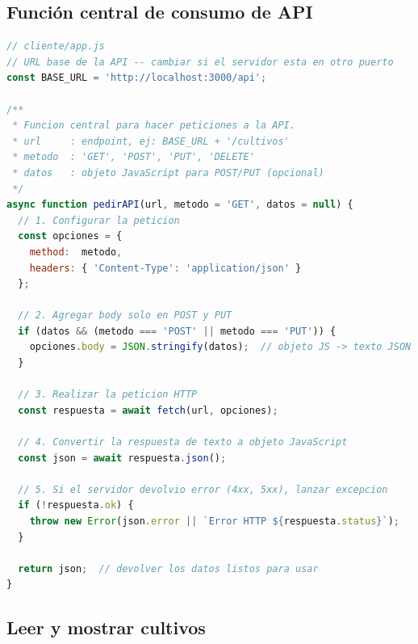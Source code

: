 \documentclass[12pt, a4paper]{article}
\begin{document}
\subsection{Función central de consumo de API}

\begin{tcolorbox}[codigoBox]
\begin{lstlisting}[style=jsStyle, language=JavaScript, morekeywords={async,await,const,let}]
// cliente/app.js
// URL base de la API -- cambiar si el servidor esta en otro puerto
const BASE_URL = 'http://localhost:3000/api';

/**
 * Funcion central para hacer peticiones a la API.
 * url     : endpoint, ej: BASE_URL + '/cultivos'
 * metodo  : 'GET', 'POST', 'PUT', 'DELETE'
 * datos   : objeto JavaScript para POST/PUT (opcional)
 */
async function pedirAPI(url, metodo = 'GET', datos = null) {
  // 1. Configurar la peticion
  const opciones = {
    method:  metodo,
    headers: { 'Content-Type': 'application/json' }
  };

  // 2. Agregar body solo en POST y PUT
  if (datos && (metodo === 'POST' || metodo === 'PUT')) {
    opciones.body = JSON.stringify(datos);  // objeto JS -> texto JSON
  }

  // 3. Realizar la peticion HTTP
  const respuesta = await fetch(url, opciones);

  // 4. Convertir la respuesta de texto a objeto JavaScript
  const json = await respuesta.json();

  // 5. Si el servidor devolvio error (4xx, 5xx), lanzar excepcion
  if (!respuesta.ok) {
    throw new Error(json.error || `Error HTTP ${respuesta.status}`);
  }

  return json;  // devolver los datos listos para usar
}
\end{lstlisting}
\end{tcolorbox}

\subsection{Leer y mostrar cultivos}
\end{document}
